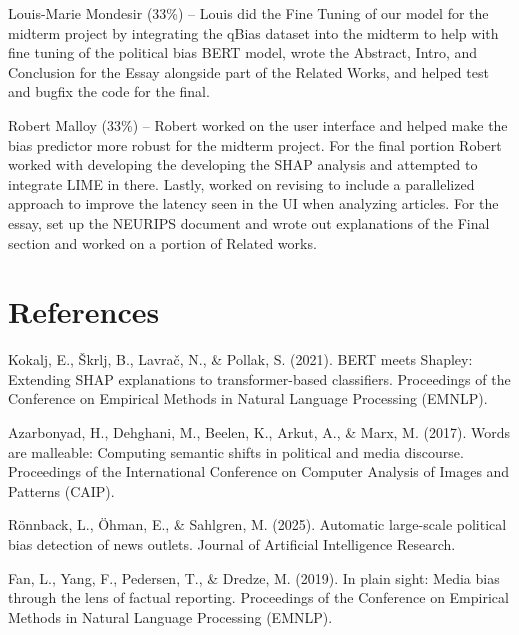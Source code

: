 \documentclass{article}
\begin{document}
Louis-Marie Mondesir (33\%) – Louis did the Fine Tuning of our model for the midterm project by integrating the qBias dataset into the midterm to help with fine tuning of the political bias BERT model, wrote the Abstract, Intro, and Conclusion for the Essay alongside part of the Related Works, and helped test and bugfix the code for the final.

Robert Malloy (33\%) – Robert worked on the user interface and helped make the bias predictor more robust for the midterm project. For the final portion Robert worked with developing the developing the SHAP analysis and attempted to integrate LIME in there. Lastly, worked on revising to include a parallelized approach to improve the latency seen in the UI when analyzing articles. For the essay, set up the NEURIPS document and wrote out explanations of the Final section and worked on a portion of Related works.

\newpage
\section*{References}

Kokalj, E., Škrlj, B., Lavrač, N., \& Pollak, S. (2021). BERT meets Shapley: Extending SHAP explanations to transformer-based classifiers. Proceedings of the Conference on Empirical Methods in Natural Language Processing (EMNLP).

Azarbonyad, H., Dehghani, M., Beelen, K., Arkut, A., \& Marx, M. (2017). Words are malleable: Computing semantic shifts in political and media discourse. Proceedings of the International Conference on Computer Analysis of Images and Patterns (CAIP).

Rönnback, L., Öhman, E., \& Sahlgren, M. (2025). Automatic large-scale political bias detection of news outlets. Journal of Artificial Intelligence Research.

Fan, L., Yang, F., Pedersen, T., \& Dredze, M. (2019). In plain sight: Media bias through the lens of factual reporting. Proceedings of the Conference on Empirical Methods in Natural Language Processing (EMNLP).
\end{document}
